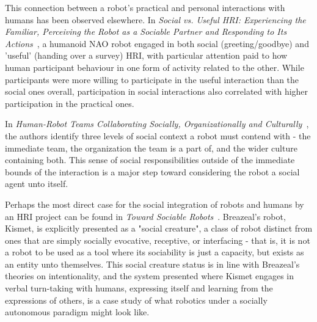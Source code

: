 \documentclass{sfuthesis}
\begin{document}
This connection between a robot's practical and personal interactions with humans has been observed elsewhere. In \textit{Social vs. Useful HRI: Experiencing the Familiar, Perceiving the Robot as a Sociable Partner and Responding to Its Actions}~\cite{baddoura2013social}, a humanoid NAO robot engaged in both social (greeting/goodbye) and 'useful' (handing over a survey) HRI, with particular attention paid to how human participant behaviour in one form of activity related to the other. While participants were more willing to participate in the useful interaction than the social ones overall, participation in social interactions also correlated with higher participation in the practical ones.

In \textit{Human-Robot Teams Collaborating Socially, Organizationally and Culturally}~\cite{fiore2011human}, the authors identify three levels of social context a robot must contend with - the immediate team, the organization the team is a part of, and the wider culture containing both. This sense of social responsibilities outside of the immediate bounds of the interaction is a major step toward considering the robot a social agent unto itself.

Perhaps the most direct case for the social integration of robots and humans by an HRI project can be found in \textit{Toward Sociable Robots}~\cite{breazeal2003toward}. Breazeal's robot, Kismet, is explicitly presented as a "social creature", a class of robot distinct from ones that are simply socially evocative, receptive, or interfacing - that is, it is not a robot to be used as a tool where its sociability is just a capacity, but exists as an entity unto themselves. This social creature status is in line with Breazeal's theories on intentionality, and the system presented where Kismet engages in verbal turn-taking with humans, expressing itself and learning from the expressions of others, is a case study of what robotics under a socially autonomous paradigm might look like. 




\end{document}
